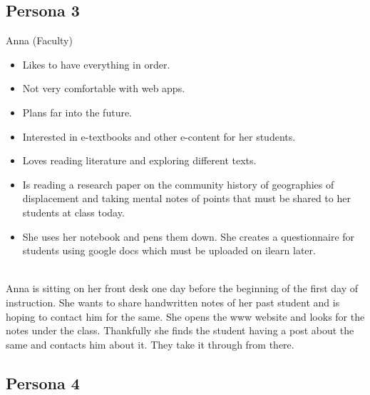 \subsection{Persona 3}
\begin{description}[font=\bfseries\itshape]
\item[Actor:]Anna (Faculty)
\item[About:]\hfill
\begin{itemize}[leftmargin=0mm]
\item Likes to have everything in order.
\item Not very comfortable with web apps.
\item Plans far into the future.
\item Interested in e-textbooks and other e-content for her students.
\item Loves reading literature and exploring different texts.
\end{itemize}
\item[Goals \& Scenario:]\hfill
\begin{itemize}[leftmargin=0mm]
\item Is reading a research paper on the community history of geographies of displacement and taking mental notes of points that must be shared to her students at class today.
\item She uses her notebook and pens them down. She creates a questionnaire for students using google docs which must be uploaded on ilearn later.
\end{itemize}
\item[Use Case:]\hfill\\
Anna is sitting on her front desk one day before the beginning of the first day of instruction. She wants to share handwritten notes of her past student and is hoping to contact him for the same. She opens the www website and looks for the notes under the class. Thankfully she finds the student having a post about the same and contacts him about it. They take it through from there.

\end{description}\subsection{Persona 4}
